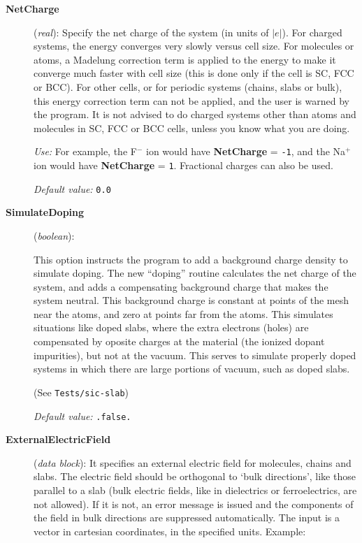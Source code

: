 \documentclass[11pt]{article}
\begin{document}
\begin{description}

\item[{\bf NetCharge}] ({\it real}): 
Specify the net charge of the system (in units of $|e|$). 
For charged systems, the energy converges very slowly
versus cell size. For molecules or atoms, a Madelung
correction term is applied to the energy to make it converge
much faster with cell size (this is done only if
the cell is SC, FCC or BCC). For other cells, or for 
periodic systems (chains, slabs or bulk), this energy
correction term can not be applied, and the user is warned
by the program.   It is not advised to do charged systems
other than atoms and molecules in SC, FCC or BCC cells,
unless you know what you are doing.

{\it Use:} 
For example, the F$^-$ ion would have {\bf NetCharge} = {\tt -1},
and the Na$^+$ ion would have {\bf NetCharge} = {\tt 1}.
Fractional charges can also be used.

{\it Default value:} {\tt 0.0} 

\item[{\bf SimulateDoping}] ({\it boolean}): 

This option instructs the program to add a background charge density
to simulate doping.  The new ``doping'' routine calculates the net
charge of the system, and adds a compensating background charge that
makes the system neutral. This background charge is constant at points
of the mesh near the atoms, and zero at points far from the atoms.
This simulates situations like doped slabs, where the extra electrons
(holes) are compensated by oposite charges at the material (the
ionized dopant impurities), but not at the vacuum.  This serves to
simulate properly doped systems in which there are large portions of
vacuum, such as doped slabs.

(See {\tt Tests/sic-slab})

{\it Default value:} {\tt .false.}

\item[{\bf ExternalElectricField}] ({\it data block}): 
It specifies an external electric field for molecules, chains and slabs.
The electric field should be orthogonal to `bulk directions', like
those parallel to a slab (bulk electric fields, like in
dielectrics or ferroelectrics, are not allowed). If it is not, an
error message is issued and the components of the field in bulk
directions are suppressed automatically. The input is a
vector in cartesian coordinates, in the specified units. Example:


\end{description}
\end{document}
